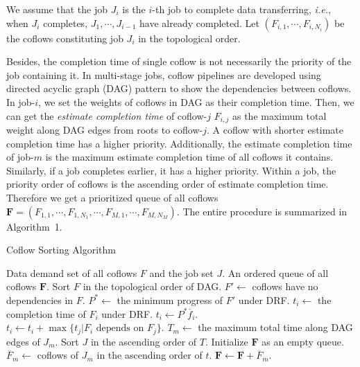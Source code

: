 \documentclass[10pt, conference, letterpaper]{IEEEtran}
\begin{document}
We assume that the job $J_i$ is the $i$-th job to complete data transferring, \emph{i.e.}, when $J_i$ completes, $J_1,\cdots,J_{i-1}$ have already completed. Let $(F_{i,1},\cdots,F_{i,N_i})$ be the coflows constituting job $J_i$ in the topological order.

Besides, the completion time of single coflow is not necessarily the priority of the job containing it. In multi-stage jobs, coflow pipelines are developed using directed acyclic graph (DAG) pattern to show the dependencies between coflows. In job-$i$, we set the weights of coflows in DAG as their completion time. Then, we can get the \emph{estimate completion time} of coflow-$j$ $F_{i,j}$ as the maximum total weight along DAG edges from roots to coflow-$j$. A coflow with shorter estimate completion time has a higher priority. Additionally, the estimate completion time of job-$m$ is the maximum estimate completion time of all coflows it contains. Similarly, if a job completes earlier, it has a higher priority. Within a job, the priority order of coflows is the ascending order of estimate completion time. Therefore we get a prioritized queue of all coflows $\mathbf{F} = (F_{1,1},\cdots,F_{1,N_1},\cdots,F_{M,1},\cdots,F_{M,N_M})$. The entire procedure is summarized in Algorithm~1.

\begin{algorithm}
	\caption{Coflow Sorting Algorithm}
	\begin{algorithmic}[1]
		\Require Data demand set of all coflows $F$ and the job set $J$.
		\Ensure An ordered queue of all coflows $\mathbf{F}$.
		\State Sort $F$ in the topological order of DAG.
		\State $F' \gets $ coflows have no dependencies in $F$.
		\State $P^* \gets$ the minimum progress of $F'$ under DRF.
				\State $t_i \gets$ the completion time of $F_i$ under DRF.
			\Else
				\State $t_i \gets P^*\overline{f}_i$.
			\EndIf
				\State $t_i \gets t_i + \max{\{t_j|F_i \text{ depends on } F_j\}}$.
			\EndIf
		\EndFor
		\State $T_m \gets$ the maximum total time along DAG edges of $J_m$.
		\State Sort $J$ in the ascending order of $T$.
		\State Initialize $\mathbf{F}$ as an empty queue.
			\State $\overline{F}_m \gets$ coflows of $J_m$ in the ascending order of $t$.
			\State $\mathbf{F} \gets \mathbf{F} + \overline{F}_m$.
		\EndFor
	\end{algorithmic}
\end{algorithm}
\end{document}
